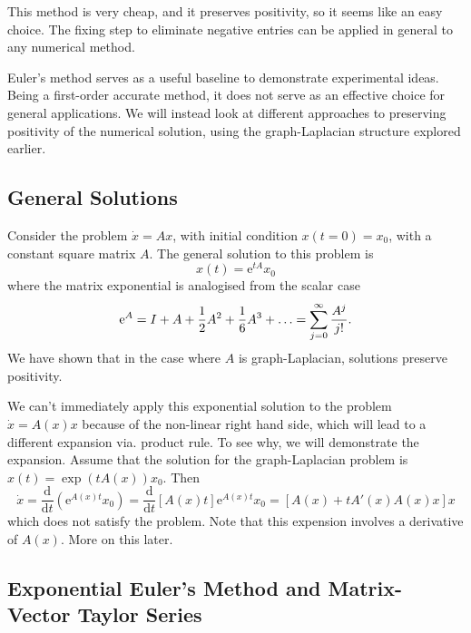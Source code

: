 This method is very cheap, and it preserves positivity, so it seems like an easy choice.
The fixing step to eliminate negative entries can be applied in general to any numerical method.

Euler's method serves as a useful baseline to demonstrate experimental ideas.
Being a first-order accurate method, it does not serve as an effective choice for general applications.
We will instead look at different approaches to preserving positivity of the numerical solution,
using the graph-Laplacian structure explored earlier.

\subsection{General Solutions}

Consider the problem $\dot{x} = Ax$, with initial condition $x(t=0) = x_0$, with a constant square matrix $A$.
The general solution to this problem is
\begin{equation*}
    x(t) = \mathrm{e}^{tA} x_0
\end{equation*}
where the matrix exponential is analogised from the scalar case
\begin{equation*}
    \mathrm{e}^A = I + A + \frac{1}{2}A^2 + \frac{1}{6}A^3 + \mathellipsis = \sum_{j=0}^{\infty} \frac{A^j}{j!}.
\end{equation*}
We have shown that in the case where $A$ is graph-Laplacian, solutions preserve positivity.

We can't immediately apply this exponential solution to the problem $\dot{x} = A(x)x$ because of the non-linear right hand side, which will lead to a different expansion via. product rule.
To see why, we will demonstrate the expansion. Assume that the solution for the graph-Laplacian problem is $x(t) = \exp(tA(x))x_0$.
Then
\begin{equation*}
    \dot{x} = \frac{\mathrm{d}}{\mathrm{d}t} \left(
        \mathrm{e}^{A(x)t}x_0 
    \right) = \frac{\mathrm{d}}{\mathrm{d}t} \left[
        A(x)t
    \right] \mathrm{e}^{A(x)t}x_0 = \left[
        A(x) + t A'(x) A(x) x
    \right] x
\end{equation*}
which does not satisfy the problem.
Note that this expension involves a derivative of $A(x)$. More on this later.

\subsection{Exponential Euler's Method and Matrix-Vector Taylor Series}

